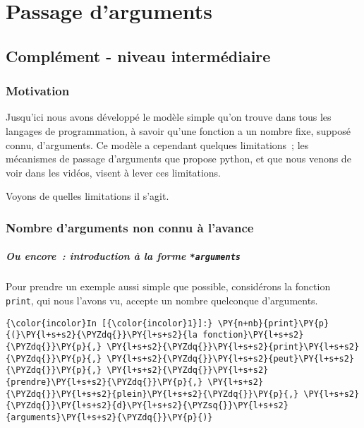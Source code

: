     
    
    
    

    

    \hypertarget{passage-darguments}{%
\section{Passage d'arguments}\label{passage-darguments}}

    \hypertarget{compluxe9ment---niveau-intermuxe9diaire}{%
\subsection{Complément - niveau
intermédiaire}\label{compluxe9ment---niveau-intermuxe9diaire}}

    \hypertarget{motivation}{%
\subsubsection{Motivation}\label{motivation}}

    Jusqu'ici nous avons développé le modèle simple qu'on trouve dans tous
les langages de programmation, à savoir qu'une fonction a un nombre
fixe, supposé connu, d'arguments. Ce modèle a cependant quelques
limitations~; les mécanismes de passage d'arguments que propose python,
et que nous venons de voir dans les vidéos, visent à lever ces
limitations.

Voyons de quelles limitations il s'agit.

    \hypertarget{nombre-darguments-non-connu-uxe0-lavance}{%
\subsubsection{Nombre d'arguments non connu à
l'avance}\label{nombre-darguments-non-connu-uxe0-lavance}}

    \hypertarget{ou-encore-introduction-uxe0-la-forme-arguments}{%
\subparagraph{\texorpdfstring{Ou encore~: introduction à la forme
\texttt{*arguments}}{Ou encore~: introduction à la forme *arguments}}\label{ou-encore-introduction-uxe0-la-forme-arguments}}

    Pour prendre un exemple aussi simple que possible, considérons la
fonction \texttt{print}, qui nous l'avons vu, accepte un nombre
quelconque d'arguments.

    \begin{Verbatim}[commandchars=\\\{\},frame=single,framerule=0.3mm,rulecolor=\color{cellframecolor}]
{\color{incolor}In [{\color{incolor}1}]:} \PY{n+nb}{print}\PY{p}{(}\PY{l+s+s2}{\PYZdq{}}\PY{l+s+s2}{la fonction}\PY{l+s+s2}{\PYZdq{}}\PY{p}{,} \PY{l+s+s2}{\PYZdq{}}\PY{l+s+s2}{print}\PY{l+s+s2}{\PYZdq{}}\PY{p}{,} \PY{l+s+s2}{\PYZdq{}}\PY{l+s+s2}{peut}\PY{l+s+s2}{\PYZdq{}}\PY{p}{,} \PY{l+s+s2}{\PYZdq{}}\PY{l+s+s2}{prendre}\PY{l+s+s2}{\PYZdq{}}\PY{p}{,} \PY{l+s+s2}{\PYZdq{}}\PY{l+s+s2}{plein}\PY{l+s+s2}{\PYZdq{}}\PY{p}{,} \PY{l+s+s2}{\PYZdq{}}\PY{l+s+s2}{d}\PY{l+s+s2}{\PYZsq{}}\PY{l+s+s2}{arguments}\PY{l+s+s2}{\PYZdq{}}\PY{p}{)}
\end{Verbatim}


